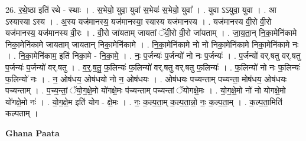 \documentclass[17pt]{extarticle}
\begin{document}
26. र॒थे॒ष्ठा इति॑ रथे - स्थाः । . स॒भेयो॒ युवा॒ युवा॑ स॒भेयः॑ स॒भेयो॒ युवा᳚ । . युवा ऽऽयुवा॒ युवा । . आ ऽस्यास्या ऽस्य । . अ॒स्य यज॑मानस्य॒ यज॑मानस्या॒ स्यास्य यज॑मानस्य । . यज॑मानस्य वी॒रो वी॒रो यज॑मानस्य॒ यज॑मानस्य वी॒रः । . वी॒रो जा॑यताम् जायतां ॅवी॒रो वी॒रो जा॑यताम् । . जा॒य॒ता॒न् नि॒का॒मेनि॑कामे निका॒मेनि॑कामे जायताम् जायतान् निका॒मेनि॑कामे । . नि॒का॒मेनि॑कामे नो नो निका॒मेनि॑कामे निका॒मेनि॑कामे नः । . नि॒का॒मेनि॑काम॒ इति॑ निका॒मे - नि॒का॒मे॒ । . नः॒ प॒र्जन्यः॑ प॒र्जन्यो॑ नो नः प॒र्जन्यः॑ । . प॒र्जन्यो॑ वर्.षतु वर्.षतु प॒र्जन्यः॑ प॒र्जन्यो॑ वर्.षतु । . व॒र्॒.ष॒तु॒ फ॒लिन्यः॑ फ॒लिन्यो॑ वर्.षतु वर्.षतु फ॒लिन्यः॑ । . फ॒लिन्यो॑ नो नः फ॒लिन्यः॑ फ॒लिन्यो॑ नः । . न॒ ओष॑धय॒ ओष॑धयो नो न॒ ओष॑धयः । . ओष॑धयः पच्यन्ताम् पच्यन्ता॒ मोष॑धय॒ ओष॑धयः पच्यन्ताम् । . प॒च्य॒न्तां॒ ॅयो॒ग॒क्षे॒मो यो॑गक्षे॒मः प॑च्यन्ताम् पच्यन्तां ॅयोगक्षे॒मः । . यो॒ग॒क्षे॒मो नो॑ नो योगक्षे॒मो यो॑गक्षे॒मो नः॑ । . यो॒ग॒क्षे॒म इति॑ योग - क्षे॒मः । . नः॒ क॒ल्प॒ता॒म् क॒ल्प॒ता॒न्नो॒ नः॒ क॒ल्प॒ता॒म् । . क॒ल्प॒ता॒मिति॑ कल्पताम् । \newline

\textbf{Ghana Paata } \newline
\end{document}
